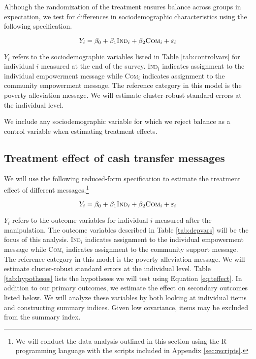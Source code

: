 \documentclass[11pt, a4paper]{article}\usepackage[]{graphicx}\usepackage[]{color}
\begin{document}
        Although the randomization of the treatment ensures balance across groups in expectation, we test for differences in sociodemographic characteristics using the following specification.

        \begin{equation} \label{eq:balance}
        Y_{i} = \beta_{0} + \beta_{1}\text{\textsc{Ind}}_{i} + \beta_{2}\text{\textsc{Com}}_{i} + \varepsilon_{i}
        \end{equation}

        $Y_{i}$ refers to the sociodemographic variables listed in Table \ref{tab:controlvars} for individual $i$ measured at the end of the survey. \textsc{Ind}$_{i}$ indicates assignment to the individual empowerment message while \textsc{Com}$_{i}$ indicates assignment to the community empowerment message. The reference category in this model is the poverty alleviation message. We will estimate cluster-robust standard errors at the individual level.

        We include any sociodemographic variable for which we reject balance as a control variable when estimating treatment effects.

    \subsection{Treatment effect of cash transfer messages}

        We will use the following reduced-form specification to estimate the treatment effect of different messages.\footnote{We will conduct the data analysis outlined in this section using the R programming language with the scripts included in Appendix \ref{sec:rscripts}.}

  		\begin{equation} \label{eq:teffect}
            Y_{i} = \beta_{0} + \beta_{1}\text{\textsc{Ind}}_{i} + \beta_{2}\text{\textsc{Com}}_{i} + \varepsilon_{i}
		\end{equation}


        $Y_{i}$ refers to the outcome variables for individual $i$ measured after the manipulation. The outcome variables described in Table \ref{tab:depvars} will be the focus of this analysis. \textsc{Ind}$_{i}$ indicates assignment to the individual empowerment message while \textsc{Com}$_{i}$ indicates assignment to the community support message. The reference category in this model is the poverty alleviation message. We will estimate cluster-robust standard errors at the individual level. Table \ref{tab:hypotheses} lists the hypotheses we will test using Equation \ref{eq:teffect}. In addition to our primary outcomes, we estimate the effect on secondary outcomes listed below. We will analyze these variables by both looking at individual items and constructing summary indices. Given low covariance, items may be excluded from the summary index.
\end{document}
